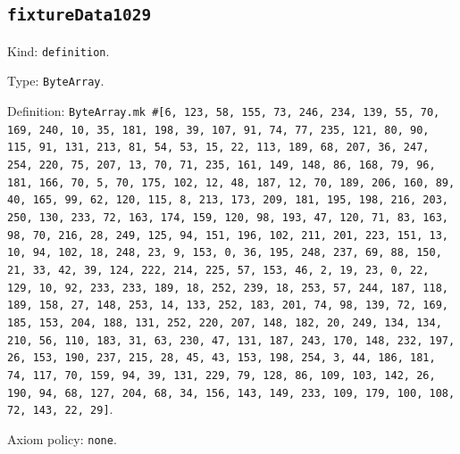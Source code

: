 \documentclass[11pt]{article}
\begin{document}
\subsection*{\texttt{fixtureData1029}}
\noindent Kind: \texttt{definition}.\par
\noindent Type: \texttt{ByteArray}.\par
\noindent Definition: \texttt{ByteArray.mk \#[6, 123, 58, 155, 73, 246, 234, 139, 55, 70, 169, 240, 10, 35, 181, 198, 39, 107, 91, 74, 77, 235, 121, 80, 90, 115, 91, 131, 213, 81, 54, 53, 15, 22, 113, 189, 68, 207, 36, 247, 254, 220, 75, 207, 13, 70, 71, 235, 161, 149, 148, 86, 168, 79, 96, 181, 166, 70, 5, 70, 175, 102, 12, 48, 187, 12, 70, 189, 206, 160, 89, 40, 165, 99, 62, 120, 115, 8, 213, 173, 209, 181, 195, 198, 216, 203, 250, 130, 233, 72, 163, 174, 159, 120, 98, 193, 47, 120, 71, 83, 163, 98, 70, 216, 28, 249, 125, 94, 151, 196, 102, 211, 201, 223, 151, 13, 10, 94, 102, 18, 248, 23, 9, 153, 0, 36, 195, 248, 237, 69, 88, 150, 21, 33, 42, 39, 124, 222, 214, 225, 57, 153, 46, 2, 19, 23, 0, 22, 129, 10, 92, 233, 233, 189, 18, 252, 239, 18, 253, 57, 244, 187, 118, 189, 158, 27, 148, 253, 14, 133, 252, 183, 201, 74, 98, 139, 72, 169, 185, 153, 204, 188, 131, 252, 220, 207, 148, 182, 20, 249, 134, 134, 210, 56, 110, 183, 31, 63, 230, 47, 131, 187, 243, 170, 148, 232, 197, 26, 153, 190, 237, 215, 28, 45, 43, 153, 198, 254, 3, 44, 186, 181, 74, 117, 70, 159, 94, 39, 131, 229, 79, 128, 86, 109, 103, 142, 26, 190, 94, 68, 127, 204, 68, 34, 156, 143, 149, 233, 109, 179, 100, 108, 72, 143, 22, 29]}.\par
\noindent Axiom policy: \texttt{none}.\par
\end{document}
